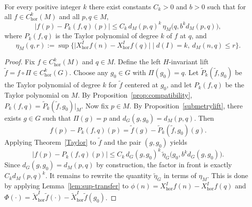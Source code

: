 \documentclass[10pt,a4paper]{amsart}
\begin{document}
\begin{theorem}\label{TaylorQuotients}
For every positive integer $k$ there exist constants $C_k>0$ and $b>0$ such that
for all $f\in C^k_{\mathrm{hor}}(M)$ and all $p,q\in M$,
\begin{equation}\label{eq:Taylor-M}
\big| f(p)- P_k(f,q)(p)\big|
\leq
C_k\, d_M(p,q)^k\,
\eta_M\big(q,b^k d_M(p,q)\big),
\end{equation}
where $P_k(f,q)$ is the  Taylor polynomial of degree $k$ of $f$ at $q$,
and
\[
\eta_M(q,r)
:=
\sup\big\{
\big| X_{\mathrm{hor}}^I f(n)-X_{\mathrm{hor}}^I f(q)\big|
\;\big|\;
d(I)=k,\ d_M(n,q)\le r
\big\}.
\]
\end{theorem}

\begin{proof}
Fix $f\in C^k_{\mathrm{hor}}(M)$ and $q\in M$.  Define the left $H$-invariant lift
\(
\tilde f = f\circ \Pi \in C^k_{\mathrm{hor}}(G).
\)
Choose any $g_0\in G$ with $\Pi(g_0)=q$.
Let $\tilde P_k(\tilde f,g_0)$ be the  Taylor polynomial of degree $k$ for $\tilde f$
centered at $g_0$, and let $P_k(f,q)$ be the Taylor polynomial on $M$.
By Proposition~\ref{prop:compatibility}, \(
P_k(f,q) = \tilde P_k(\tilde f,g_0)\big|_{M}.
\)
Now fix $p\in M$. 
By Proposition~\ref{submetrylift}, there exists
$g\in G$ such that
\(
\Pi(g)=p\) and \( d_G(g,g_0)=d_M(p,q).
\)
Then
\[
f(p)-P_k(f,q)(p)
=
\tilde f(g) - \tilde P_k(\tilde f,g_0)(g).
\]
Applying Theorem~\ref{Taylor} to $\tilde f$ and the pair $(g,g_0)$ yields
\begin{equation}\label{eq:TQ-step1}
\big| f(p)-P_k(f,q)(p)\big|
\leq
C_k\, d_G(g,g_0)^k\, \tilde \eta_G\big(g_0,b^k d_G(g,g_0)\big).
\end{equation}
Since $d_G(g,g_0)=d_M(p,q)$ by construction, the factor in front is exactly
$C_k d_M(p,q)^k$.  It remains to rewrite the quantity $\tilde \eta_G$ in terms of $\eta_M$. This is done by applying  Lemma~\ref{lem:sup-transfer} to $\phi(n) = X_{\mathrm{hor}}^I f(n)-X_{\mathrm{hor}}^I f(q)$ and $\Phi(\cdot) = \tilde X_{\mathrm{hor}}^I \tilde f(\cdot)-\tilde X_{\mathrm{hor}}^I \tilde f(g_0)$.


\end{proof}
\end{document}
